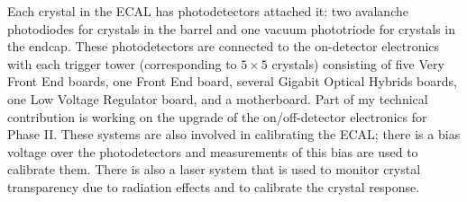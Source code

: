 \documentclass[12pt]{article}
\begin{document}
Each crystal in the ECAL has photodetectors attached it: two avalanche photodiodes for crystals in the barrel and one vacuum phototriode for crystals in the endcap. These photodetectors are connected to the on-detector electronics with each trigger tower (corresponding to $5 \times 5$ crystals) consisting of five Very Front End boards, one Front End board, several Gigabit Optical Hybrids boards, one Low Voltage Regulator board, and a motherboard. Part of my technical contribution is working on the upgrade of the on/off-detector electronics for Phase II. These systems are also involved in calibrating the ECAL; there is a bias voltage over the photodetectors and measurements of this bias are used to calibrate them. There is also a laser system that is used to monitor crystal transparency due to radiation effects and to calibrate the crystal response.\par


\end{document}
